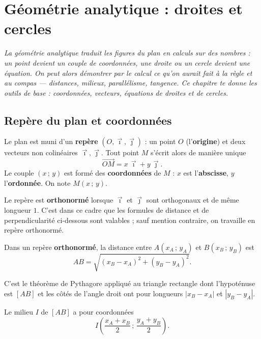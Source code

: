 \chapter{Géométrie analytique : droites et cercles}
\textit{La géométrie analytique traduit les figures du plan en calculs sur des
nombres : un point devient un couple de coordonnées, une droite ou un cercle
devient une équation. On peut alors démontrer par le calcul ce qu'on aurait fait
à la règle et au compas — distances, milieux, parallélisme, tangence. Ce chapitre
te donne les outils de base : coordonnées, vecteurs, équations de droites et de
cercles.}

\section{Repère du plan et coordonnées}

\begin{definition}
Le plan est muni d'un \textbf{repère} $(O,\vec{\imath},\vec{\jmath})$ : un point
$O$ (l'\textbf{origine}) et deux vecteurs non colinéaires $\vec{\imath},\vec{\jmath}$.
Tout point $M$ s'écrit alors de manière unique
\[ \overrightarrow{OM}=x\,\vec{\imath}+y\,\vec{\jmath}. \]
Le couple $(x\,;\,y)$ est formé des \textbf{coordonnées} de $M$ : $x$ est
l'\textbf{abscisse}, $y$ l'\textbf{ordonnée}. On note $M(x\,;\,y)$.
\end{definition}

\begin{remarque}
Le repère est \textbf{orthonormé} lorsque $\vec{\imath}$ et $\vec{\jmath}$ sont
orthogonaux et de même longueur $1$. C'est dans ce cadre que les formules de
distance et de perpendicularité ci-dessous sont valables ; sauf mention contraire,
on travaille en repère orthonormé.
\end{remarque}

\begin{propriete}
Dans un repère \textbf{orthonormé}, la distance entre $A(x_A\,;\,y_A)$ et
$B(x_B\,;\,y_B)$ est
\[ AB=\sqrt{(x_B-x_A)^2+(y_B-y_A)^2}. \]
\end{propriete}

\begin{remarque}
C'est le théorème de Pythagore appliqué au triangle rectangle dont l'hypoténuse est
$[AB]$ et les côtés de l'angle droit ont pour longueurs $|x_B-x_A|$ et $|y_B-y_A|$.
\end{remarque}

\begin{propriete}
Le milieu $I$ de $[AB]$ a pour coordonnées
\[ I\left(\frac{x_A+x_B}{2}\,;\,\frac{y_A+y_B}{2}\right). \]
\end{propriete}

